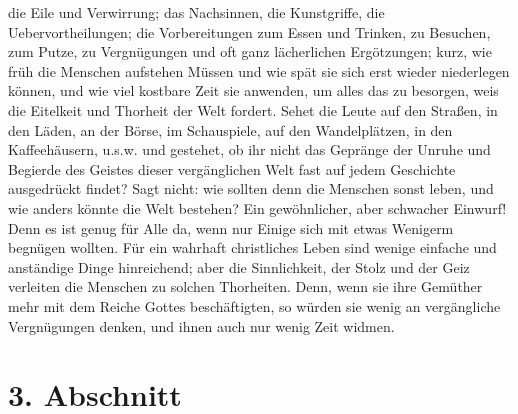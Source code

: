 die Eile und Verwirrung; das Nachsinnen, die Kunstgriffe, die
Uebervortheilungen; die Vorbereitungen zum Essen und Trinken, zu Besuchen, zum
Putze, zu Vergnügungen und oft ganz lächerlichen Ergötzungen; kurz, wie früh die
Menschen aufstehen Müssen und wie spät sie sich erst wieder niederlegen können,
und wie viel kostbare Zeit sie anwenden, um alles das zu besorgen, weis die
Eitelkeit und Thorheit der Welt fordert. Sehet die Leute auf den Straßen, in den
Läden, an der Börse, im Schauspiele, auf den Wandelplätzen, in den
Kaffeehäusern, u.s.w. und gestehet, ob ihr nicht das Gepränge der Unruhe und
Begierde des Geistes dieser vergänglichen Welt fast auf jedem Geschichte
ausgedrückt findet? Sagt nicht: wie sollten denn die Menschen sonst leben, und
wie anders könnte die Welt bestehen? Ein gewöhnlicher, aber schwacher Einwurf!
Denn es ist genug für Alle da, wenn nur Einige sich mit etwas Wenigerm begnügen
wollten. Für ein wahrhaft christliches Leben sind wenige einfache und anständige
Dinge hinreichend; aber die Sinnlichkeit, der Stolz und der Geiz verleiten die
Menschen zu solchen Thorheiten. Denn, wenn sie ihre Gemüther mehr mit dem Reiche
Gottes beschäftigten, so würden sie wenig an vergängliche Vergnügungen denken,
und ihnen auch nur wenig Zeit widmen.

\section{3. Abschnitt}


